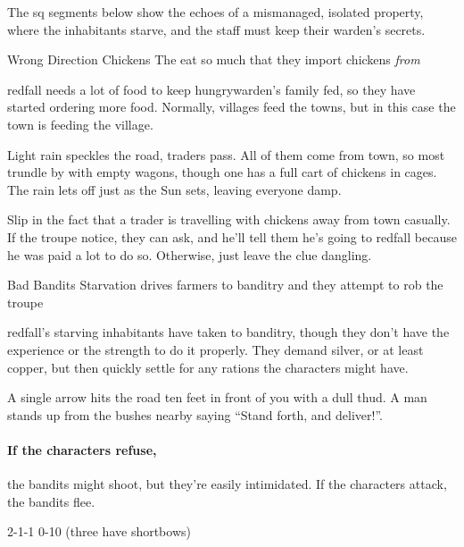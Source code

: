 The \gls{sq} \glspl{segment} below show the echoes of a mismanaged, isolated property, where the inhabitants starve, and the staff must keep their \gls{warden}'s secrets.

{Wrong Direction Chickens}%
{The   eat so much that they import chickens \emph{from} }%

\Gls{redfall} needs a lot of food to keep \gls{hungrywarden}'s family fed, so they have started ordering more food.
Normally, \glspl{village} feed the towns, but in this case the town is feeding the \gls{village}.

\begin{boxtext}
  Light rain speckles the road, traders pass.
  All of them come from \gls{town}, so most trundle by with empty wagons, though one has a full cart of chickens in cages.
  The rain lets off just as the Sun sets, leaving everyone damp.
\end{boxtext}

Slip in the fact that a trader is travelling with chickens away from \gls{town} casually.
If the troupe notice, they can ask, and he'll tell them he's going to \gls{redfall} because he was paid a lot to do so.
Otherwise, just leave the clue dangling.

{Bad Bandits}%
{Starvation drives  farmers to banditry and they attempt to rob the troupe}%

\Gls{redfall}'s starving inhabitants have taken to banditry, though they don't have the experience or the strength to do it properly.
They demand silver, or at least copper, but then quickly settle for any \glspl{ration} the characters might have.

\begin{boxtext}
  A single arrow hits the road ten feet in front of you with a dull thud.
  A man stands up from the bushes nearby saying ``Stand forth, and deliver!''.
\end{boxtext}

\paragraph{If the characters refuse,}
the bandits might shoot, but they're easily intimidated.
If the characters attack, the bandits flee.

%
  {{2}{-1}{-1}}%
  {{0}{-1}{0}}%
  {%
    \Dagger
  }%
  {}%
  {(three have shortbows)}%
  {}%

